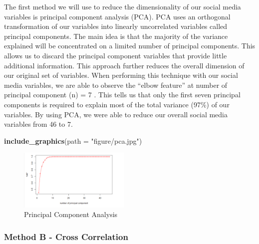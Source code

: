 \documentclass[12pt,oneside]{chicagocapstone}
\newenvironment{Shaded}{\begin{snugshade}}{\end{snugshade}}
\newcommand{\DataTypeTok}[1]{\textcolor[rgb]{0.13,0.29,0.53}{#1}}
\newcommand{\KeywordTok}[1]{\textcolor[rgb]{0.13,0.29,0.53}{\textbf{#1}}}
\newcommand{\NormalTok}[1]{#1}
\newcommand{\StringTok}[1]{\textcolor[rgb]{0.31,0.60,0.02}{#1}}
\begin{document}
The first method we will use to reduce the dimensionality of our social media variables is principal component analysis (PCA). PCA uses an orthogonal transformation of our variables into linearly uncorrelated variables called principal components. The main idea is that the majority of the variance explained will be concentrated on a limited number of principal components. This allows us to discard the principal component variables that provide little additional information. This approach further reduces the overall dimension of our original set of variables. When performing this technique with our social media variables, we are able to observe the ``elbow feature'' at number of principal component (n) = 7 . This tells us that only the first seven principal components is required to explain most of the total variance (97\%) of our variables. By using PCA, we were able to reduce our overall social media variables from 46 to 7.
\begin{Shaded}
\begin{Highlighting}[]
\KeywordTok{include_graphics}\NormalTok{(}\DataTypeTok{path =} \StringTok{"figure/pca.jpg"}\NormalTok{)}
\end{Highlighting}
\end{Shaded}
\begin{figure}

{\centering \includegraphics[width=200px]{figure/pca} 

}

\caption{Principal Component Analysis}\label{fig:pca}
\end{figure}
\hypertarget{method-b---cross-correlation}{%
\subsubsection*{Method B - Cross Correlation}\label{method-b---cross-correlation}}
\end{document}
